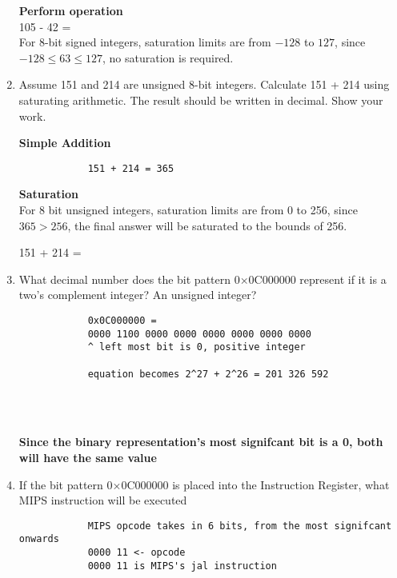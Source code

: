 \documentclass{article}
\begin{document}
\begin{enumerate}
        \textbf{Perform operation}\\[0.25in]
        105 - 42 = \\[0.25in]
        For 8-bit signed integers, saturation limits are from $-128$ to $127$, since $-128\leq63\leq127$, no saturation is required.

        \item Assume 151 and 214 are unsigned 8-bit integers. Calculate 151 + 214 using saturating arithmetic. The result should be written in decimal. Show your work.
        
        \textbf{Simple Addition}
        \begin{verbatim}
            151 + 214 = 365
        \end{verbatim}

        \textbf{Saturation}\\
        For 8 bit unsigned integers, saturation limits are from 0 to 256, since $365 > 256$, the final answer will be saturated to the bounds of 256.

        151 + 214 = 

        \item What decimal number does the bit pattern 0×0C000000 represent if it is a two's complement integer? An unsigned integer?
        \begin{verbatim}
            0x0C000000 = 
            0000 1100 0000 0000 0000 0000 0000 0000
            ^ left most bit is 0, positive integer

            equation becomes 2^27 + 2^26 = 201 326 592
        \end{verbatim}
        \begin{center}
            \\
            \\
        \end{center}
        
        \textbf{Since the binary representation's most signifcant bit is a 0, both will have the same value}

        \item If the bit pattern 0×0C000000 is placed into the Instruction Register, what MIPS instruction will be executed
        \begin{verbatim}
            MIPS opcode takes in 6 bits, from the most signifcant onwards
            0000 11 <- opcode
            0000 11 is MIPS's jal instruction
        \end{verbatim}
        \begin{center}
            \\
        \end{center}
        

\end{enumerate}
\end{document}
